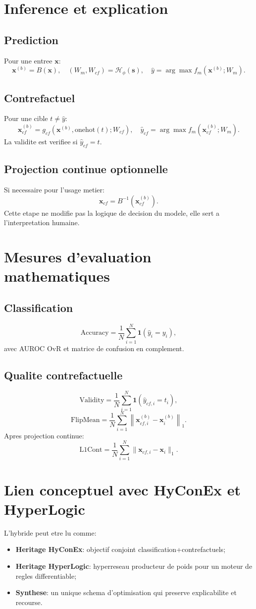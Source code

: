 \documentclass[11pt,a4paper]{article}
\begin{document}
\section{Inference et explication}
\subsection{Prediction}
Pour une entree $\bm{x}$:
\[
\bm{x}^{(b)}=B(\bm{x}),\quad
(W_m,W_{cf})=\mathcal{H}_\phi(\bm{s}),\quad
\hat{y}=\arg\max f_m(\bm{x}^{(b)};W_m).
\]

\subsection{Contrefactuel}
Pour une cible $t\neq \hat{y}$:
\[
\bm{x}_{cf}^{(b)}=g_{cf}\!\left(\bm{x}^{(b)},\text{onehot}(t);W_{cf}\right),\quad
\hat{y}_{cf}=\arg\max f_m(\bm{x}_{cf}^{(b)};W_m).
\]
La validite est verifiee si $\hat{y}_{cf}=t$.

\subsection{Projection continue optionnelle}
Si necessaire pour l'usage metier:
\[
\bm{x}_{cf}=B^{-1}(\bm{x}_{cf}^{(b)}).
\]
Cette etape ne modifie pas la logique de decision du modele, elle sert a l'interpretation humaine.

\section{Mesures d'evaluation mathematiques}
\subsection{Classification}
\[
\text{Accuracy}
=\frac{1}{N}\sum_{i=1}^{N}\mathbf{1}(\hat{y}_i=y_i),
\]
avec AUROC OvR et matrice de confusion en complement.

\subsection{Qualite contrefactuelle}
\[
\text{Validity}
=\frac{1}{N}\sum_{i=1}^{N}\mathbf{1}(\hat{y}_{cf,i}=t_i),
\]
\[
\text{FlipMean}
=\frac{1}{N}\sum_{i=1}^{N}\left\|\bm{x}^{(b)}_{cf,i}-\bm{x}^{(b)}_i\right\|_1.
\]
Apres projection continue:
\[
\text{L1Cont}
=\frac{1}{N}\sum_{i=1}^{N}\|\bm{x}_{cf,i}-\bm{x}_i\|_1.
\]

\section{Lien conceptuel avec HyConEx et HyperLogic}
L'hybride peut etre lu comme:
\begin{itemize}
    \item \textbf{Heritage HyConEx}: objectif conjoint classification+contrefactuels;
    \item \textbf{Heritage HyperLogic}: hyperreseau producteur de poids pour un moteur de regles differentiable;
    \item \textbf{Synthese}: un unique schema d'optimisation qui preserve explicabilite et recourse.
\end{itemize}
\end{document}
